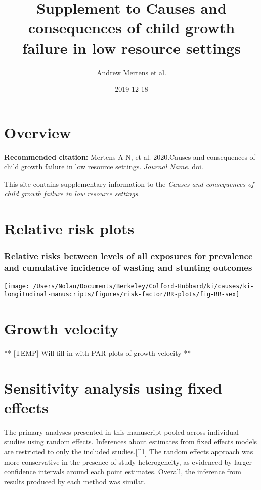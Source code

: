 \documentclass[9pt,]{book}
\title{Supplement to Causes and consequences of child growth failure in low
resource settings}
\author{Andrew Mertens et al.}
\date{2019-12-18}
\begin{document}
\maketitle

{
\setcounter{tocdepth}{1}
\tableofcontents
}
\chapter{Overview}\label{overview}

\textbf{Recommended citation:} Mertens A N, et al. 2020.Causes and
consequences of child growth failure in low resource settings.
\emph{Journal Name}. doi.

This site contains supplementary information to the \emph{Causes and
consequences of child growth failure in low resource settings}.

\chapter{Relative risk plots}\label{RR}

\raggedright

\subsection{Relative risks between levels of all exposures for
prevalence and cumulative incidence of wasting and stunting
outcomes}\label{relative-risks-between-levels-of-all-exposures-for-prevalence-and-cumulative-incidence-of-wasting-and-stunting-outcomes}

\texttt{[image: /Users/Nolan/Documents/Berkeley/Colford-Hubbard/ki/causes/ki-longitudinal-manuscripts/figures/risk-factor/RR-plots/fig-RR-sex]}

\chapter{Growth velocity}\label{velocity}

\raggedright

** {[}TEMP{]} Will fill in with PAR plots of growth velocity **

\chapter{Sensitivity analysis using fixed effects}\label{fixed-effects}

\raggedright

The primary analyses presented in this manuscript pooled across
individual studies using random effects. Inferences about estimates from
fixed effects models are restricted to only the included
studies.{[}\^{}1{]} The random effects approach was more conservative in
the presence of study heterogeneity, as evidenced by larger confidence
intervals around each point estimates. Overall, the inference from
results produced by each method was similar.
\end{document}
